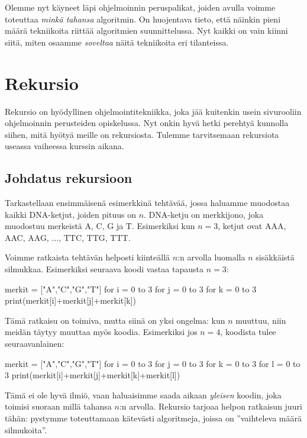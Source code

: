 Olemme nyt käyneet läpi ohjelmoinnin peruspalikat,
joiden avulla voimme toteuttaa \emph{minkä tahansa} algoritmin.
On huojentava tieto, että näinkin pieni määrä tekniikoita
riittää algoritmien suunnittelussa.
Nyt kaikki on vain kiinni siitä, miten osaamme \emph{soveltaa}
näitä tekniikoita eri tilanteissa.

\section{Rekursio}

Rekursio on hyödyllinen ohjelmointitekniikka,
joka jää kuitenkin usein sivurooliin ohjelmoinnin perusteiden opiskelussa.
Nyt onkin hyvä hetki perehtyä kunnolla siihen,
mitä hyötyä meille on rekursiosta.
Tulemme tarvitsemaan rekursiota useassa vaiheessa kurssin aikana.

\subsection{Johdatus rekursioon}

Tarkastellaan ensimmäisenä esimerkkinä tehtävää,
jossa haluamme muodostaa kaikki DNA-ketjut,
joiden pituus on $n$.
DNA-ketju on merkkijono, joka muodostuu merkeistä A, C, G ja T.
Esimerkiksi kun $n=3$, ketjut ovat AAA, AAC, AAG, $\dots$, TTC, TTG, TTT.

Voimme ratkaista tehtävän helposti kiinteällä $n$:n arvolla
luomalla $n$ sisäk\-käistä silmukkaa.
Esimerkiksi seuraava koodi vastaa tapausta $n=3$:

\begin{code}
merkit = ["A","C","G","T"]
for i = 0 to 3
    for j = 0 to 3
        for k = 0 to 3
            print(merkit[i]+merkit[j]+merkit[k])
\end{code}

Tämä ratkaisu on toimiva, mutta siinä on yksi ongelma:
kun $n$ muuttuu, niin meidän täytyy muuttaa myös koodia.
Esimerkiksi jos $n=4$, koodista tulee seuraavanlainen:

\begin{code}
merkit = ["A","C","G","T"]
for i = 0 to 3
    for j = 0 to 3
        for k = 0 to 3
            for l = 0 to 3
                print(merkit[i]+merkit[j]+merkit[k]+merkit[l])
\end{code}

Tämä ei ole hyvä ilmiö, vaan haluaisimme saada aikaan \emph{yleisen}
koodin, joka toimisi suoraan millä tahansa $n$:n arvolla.
Rekursio tarjoaa helpon ratkaisun juuri tähän:
pystymme toteuttamaan kätevästi algoritmeja, joissa on
''vaihteleva määrä silmukoita''.

